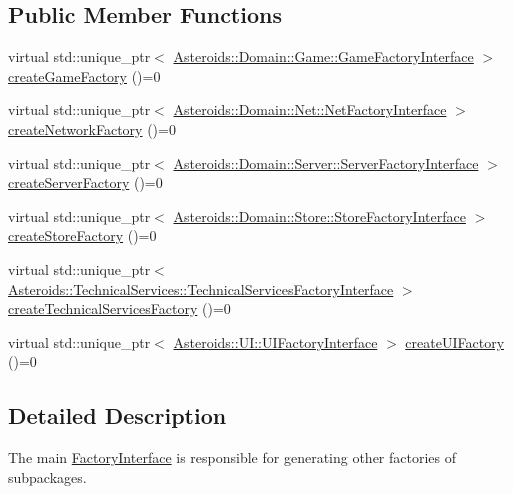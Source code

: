 \subsection*{Public Member Functions}
\begin{DoxyCompactItemize}
\item 
virtual std\+::unique\+\_\+ptr$<$ \hyperlink{classAsteroids_1_1Domain_1_1Game_1_1GameFactoryInterface}{Asteroids\+::\+Domain\+::\+Game\+::\+Game\+Factory\+Interface} $>$ \hyperlink{classAsteroids_1_1Domain_1_1Factory_1_1FactoryInterface_a1589f6b3a9c7d1ee34e9e312b6adb2c8}{create\+Game\+Factory} ()=0
\item 
virtual std\+::unique\+\_\+ptr$<$ \hyperlink{classAsteroids_1_1Domain_1_1Net_1_1NetFactoryInterface}{Asteroids\+::\+Domain\+::\+Net\+::\+Net\+Factory\+Interface} $>$ \hyperlink{classAsteroids_1_1Domain_1_1Factory_1_1FactoryInterface_ab638c74cc5a7cd464064b686b79f8056}{create\+Network\+Factory} ()=0
\item 
virtual std\+::unique\+\_\+ptr$<$ \hyperlink{classAsteroids_1_1Domain_1_1Server_1_1ServerFactoryInterface}{Asteroids\+::\+Domain\+::\+Server\+::\+Server\+Factory\+Interface} $>$ \hyperlink{classAsteroids_1_1Domain_1_1Factory_1_1FactoryInterface_a3425d5d2760883c62951a46268e6ddac}{create\+Server\+Factory} ()=0
\item 
virtual std\+::unique\+\_\+ptr$<$ \hyperlink{classAsteroids_1_1Domain_1_1Store_1_1StoreFactoryInterface}{Asteroids\+::\+Domain\+::\+Store\+::\+Store\+Factory\+Interface} $>$ \hyperlink{classAsteroids_1_1Domain_1_1Factory_1_1FactoryInterface_ae658038784c7e05435350f631f5e1924}{create\+Store\+Factory} ()=0
\item 
virtual std\+::unique\+\_\+ptr$<$ \hyperlink{classAsteroids_1_1TechnicalServices_1_1TechnicalServicesFactoryInterface}{Asteroids\+::\+Technical\+Services\+::\+Technical\+Services\+Factory\+Interface} $>$ \hyperlink{classAsteroids_1_1Domain_1_1Factory_1_1FactoryInterface_a9b67997dd9975091acd7f407e2aa71b1}{create\+Technical\+Services\+Factory} ()=0
\item 
virtual std\+::unique\+\_\+ptr$<$ \hyperlink{classAsteroids_1_1UI_1_1UIFactoryInterface}{Asteroids\+::\+U\+I\+::\+U\+I\+Factory\+Interface} $>$ \hyperlink{classAsteroids_1_1Domain_1_1Factory_1_1FactoryInterface_a2576e64553a529bd6161acb3aea9d773}{create\+U\+I\+Factory} ()=0
\end{DoxyCompactItemize}


\subsection{Detailed Description}
The main \hyperlink{classAsteroids_1_1Domain_1_1Factory_1_1FactoryInterface}{Factory\+Interface} is responsible for generating other factories of subpackages. 

